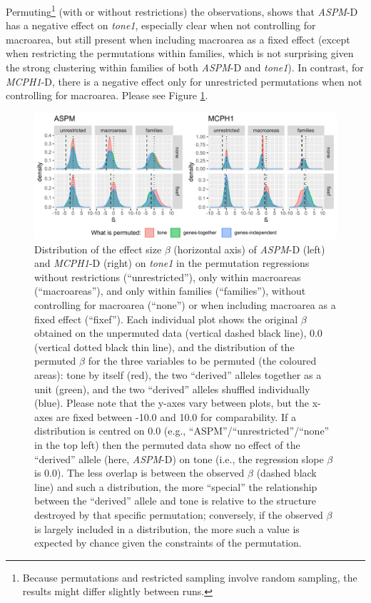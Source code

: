 \documentclass[twoside,twocolumn]{article}
\begin{document}
Permuting\footnote{Because permutations and restricted sampling involve random sampling, the results might differ slightly between runs.} (with or without restrictions) the observations, shows that \textit{ASPM}-D has a negative effect on \textit{tone1}, especially clear when not controlling for macroarea, but still present when including macroarea as a fixed effect (except when restricting the permutations within families, which is not surprising given the strong clustering within families of both \textit{ASPM}-D and \textit{tone1}).
In contrast, for \textit{MCPH1}-D, there is a negative effect only for unrestricted permutations when not controlling for macroarea.
Please see Figure \ref{Fig:tone1_regressions_permuted}.

\begin{figure}[h]
  \centering
  \includegraphics[width=\textwidth]{../../code/figures/tone1_regressions_permuted}
  \caption{Distribution of the effect size $\beta$ (horizontal axis) of \textit{ASPM}-D (left) and \textit{MCPH1}-D (right) on \textit{tone1} in the permutation regressions without restrictions (``unrestricted''), only within macroareas (``macroareas''), and only within families (``families''), without controlling for macroarea (``none'') or when including macroarea as a fixed effect (``fixef''). Each individual plot shows the original $\beta$ obtained on the unpermuted data (vertical dashed black line), 0.0 (vertical dotted black thin line), and the distribution of the permuted $\beta$ for the three variables to be permuted (the coloured areas): tone by itself (red), the two ``derived'' alleles together as a unit (green), and the two ``derived'' alleles shuffled individually (blue). Please note that the y-axes vary between plots, but the x-axes are fixed between -10.0 and 10.0 for comparability. If a distribution is centred on 0.0 (e.g., ``ASPM''/``unrestricted''/``none'' in the top left) then the permuted data show no effect of the ``derived'' allele (here, \textit{ASPM}-D) on tone (i.e., the regression slope $\beta$ is 0.0). The less overlap is between the observed $\beta$ (dashed black line) and such a distribution, the more ``special'' the relationship between the ``derived'' allele and tone is relative to the structure destroyed by that specific permutation; conversely, if the observed $\beta$ is largely included in a distribution, the more such a value is expected by chance given the constraints of the permutation.}
  \label{Fig:tone1_regressions_permuted}
\end{figure}
\end{document}
